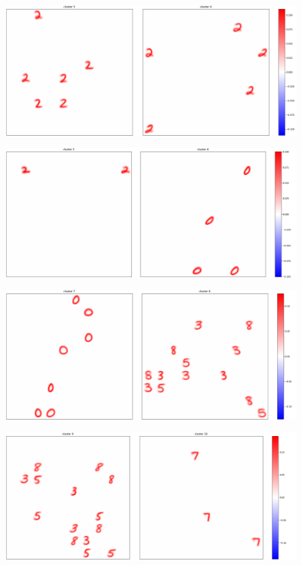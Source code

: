 \documentclass[a4paper]{report}
\begin{document}
\begin{figure} [H]
    \centering
    \includegraphics [width=\textwidth ] {c/c/3.png}
    \caption{}
\end{figure}
\begin{figure} [H]
    \centering
    \includegraphics [width=\textwidth ] {c/c/5.png}
    \caption{}
\end{figure}\begin{figure} [H]
    \centering
    \includegraphics [width=\textwidth ] {c/c/7.png}
    \caption{}
\end{figure}\begin{figure} [H]
    \centering
    \includegraphics [width=\textwidth ] {c/c/9.png}
    \caption{}
\end{figure}
\end{document}
